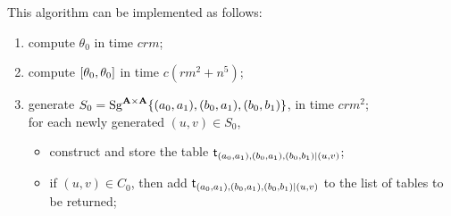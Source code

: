   This algorithm can be implemented as follows:
   \begin{enumerate}
  \item compute $\theta_0$ in time $crm$;
  \item compute $[ \theta_0 ,  \theta_0 ]$ in time $c(rm^2 + n^5)$;
  \item generate $S_0=\operatorname{Sg}^{\mathbf{A}\times \mathbf{A}} \{(a_0,a_1),(b_0,a_1),(b_0,b_1)\}$,
    in time $c r m^2$;\\
  for each newly generated $(u,v) \in S_0$,
    \begin{itemize}
    \item construct and store the table
      $\mathsf{t}_{(a_0,a_1),(b_0,a_1),(b_0,b_1)|(u,v)}$;
    \item if $(u,v) \in C_0$, then add $\mathsf{t}_{(a_0,a_1),(b_0,a_1),(b_0,b_1)|(u,v)}$
     to the list of tables to be returned;
    \end{itemize}
  \end{enumerate}




  \begin{comment}
  \noindent \underline{\textbf{Subroutine \ld-2'}}\\[4pt]
  To compute a \ldto for
  $((a_0,b_0,1), (a_1, b_1, 0))$, obviously this is symmetric to
  the situation handled in Subroutine LD2 and so the general algorithm
  is the same.  Nonetheless, we include a listing of the computational
  steps required so that later we can easily refer to this special case
  of the general algorithm.
  \begin{enumerate}[{\bf 1}]
  \item Compute $\delta_1=\com{\thetaone}$;
  \item form $C_1= \{b_0\}\times a_1/\delta_1 \leq \alg{A}\times\alg{A}$;
  \item compute
        $S_1=\Sg^{\alg{A}\times \alg{A}} ((a_0,a_1),(a_0,b_1),(b_0,b_1))$;
  \item find a term operation $t$ of $\alg{A}$ satisfying
  \[t^{\alg{A}\times\alg{A}}((a_0,a_1),(a_0,b_1),(b_0,b_1)) =
   (t^{\alg{A}}(a_0,a_0,b_0), t^{\alg{A}}(a_1,b_1,b_1)) \in C_1 \cap S_1.\]
  \end{enumerate}
  Then $t$ is a \ldto for
  $((a_0, b_0, 1), (a_1, b_1, 0))$.
  \end{comment}




